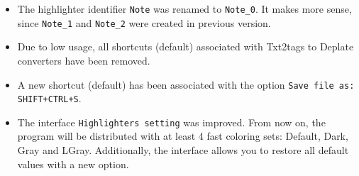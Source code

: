 \begin{itemize}
  \item The highlighter identifier \texttt{Note} was renamed to \texttt{Note\_0}. It makes more sense, since \texttt{Note\_1} and \texttt{Note\_2} were created
    in previous version.
  \item Due to low usage, all shortcuts (default) associated with Txt2tags to Deplate converters have been removed.
  \item A new shortcut (default) has been associated with the option \texttt{Save file as: SHIFT+CTRL+S}.
  \item The interface \texttt{Highlighters setting} was improved. From now on, the program will be distributed with at least 4 fast coloring sets:
    Default, Dark, Gray and LGray. Additionally, the interface allows you to restore all default values with a new option.
\end{itemize}
